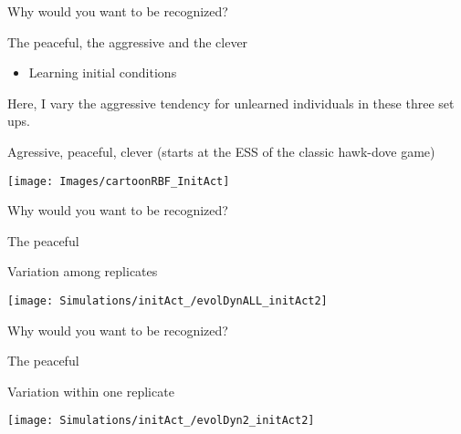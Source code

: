 \documentclass[
  ignorenonframetext,
]{beamer}
\providecommand{\tightlist}{%
  \setlength{\itemsep}{0pt}\setlength{\parskip}{0pt}}
\begin{document}
\begin{frame}{Why would you want to be recognized?}
\protect\hypertarget{why-would-you-want-to-be-recognized}{}

\pause

\begin{block}{The peaceful, the aggressive and the clever}

\begin{itemize}
\tightlist
\item
  Learning initial conditions
\end{itemize}

\tiny

Here, I vary the aggressive tendency for unlearned individuals in these
three set ups.

Agressive, peaceful, clever (starts at the ESS of the classic hawk-dove
game)

\begin{flushleft}\texttt{[image: Images/cartoonRBF\_InitAct]} \end{flushleft}

\end{block}

\end{frame}

\begin{frame}{Why would you want to be recognized?}
\protect\hypertarget{why-would-you-want-to-be-recognized-1}{}

\begin{block}{The peaceful}

Variation among replicates

\begin{flushleft}\texttt{[image: Simulations/initAct\_/evolDynALL\_initAct2]} \end{flushleft}

\end{block}

\end{frame}

\begin{frame}{Why would you want to be recognized?}
\protect\hypertarget{why-would-you-want-to-be-recognized-2}{}

\begin{block}{The peaceful}

Variation within one replicate

\begin{flushleft}\texttt{[image: Simulations/initAct\_/evolDyn2\_initAct2]} \end{flushleft}

\end{block}

\end{frame}
\end{document}
